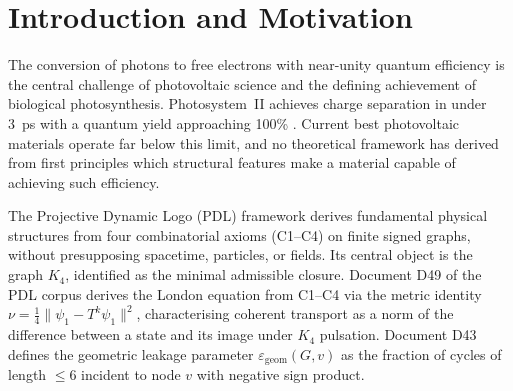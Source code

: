 \documentclass[12pt,a4paper]{article}
\newcommand{\epsgeom}{\varepsilon_{\mathrm{geom}}}
\begin{document}
\begin{abstract}
We derive a topological optimality criterion for coherent photon-to-electron
conversion from the axioms C1--C4 of the Projective Dynamic Logo (PDL)
framework. The central result (Theorem PDL-SP2) establishes that
the minimal geometric leakage $\epsgeom = 0$ is achievable on a bond
graph $G$ if and only if $G$ is bipartite — recovering the Harary
balance theorem (1953) as a corollary of C1--C4 without presupposition.
A four-criterion composite score derived from PDL selects six optimal
inorganic candidates from 21 families: BP, AlAs, GaP, AlP, GaN, and SiC.
GaN and BP are identified as priority candidates with direct gaps
of 1.73~eV and 1.24~eV respectively. An extension to hierarchical graphs
(Conjecture PDL-H) shows that global bipartition is the sole determining
condition — local graph structure is irrelevant for $\epsgeom(H)=0$.
This result is verified exhaustively on $2^{24} = 16\,777\,216$ sign
assignments for the case $H(C_5, C_4)$. Biological connection:
the Mg--Mg transfer network of Photosystem~II is bipartite, consistent
with PDL-H, while individual chlorophyll molecules are not — a two-scale
architecture that PDL explains naturally. Three falsifiable experimental
predictions are formulated, testable by femtosecond pump-probe spectroscopy
without free parameters.
\end{abstract}

\clearpage

\tableofcontents
\newpage

\section{Introduction and Motivation}
\label{sec:intro}

The conversion of photons to free electrons with near-unity quantum
efficiency is the central challenge of photovoltaic science and the
defining achievement of biological photosynthesis. Photosystem~II achieves
charge separation in under 3~ps with a quantum yield approaching 100\%
\cite{Fleming1988}. Current best photovoltaic materials operate far below
this limit, and no theoretical framework has derived from first principles
which structural features make a material capable of achieving such
efficiency.

The Projective Dynamic Logo (PDL) framework \cite{PDL_DM_v20} derives
fundamental physical structures from four combinatorial axioms (C1--C4)
on finite signed graphs, without presupposing spacetime, particles, or
fields. Its central object is the graph $K_4$, identified as the minimal
admissible closure. Document D49 of the PDL corpus derives the London
equation from C1--C4 via the metric identity
$\nu = \tfrac{1}{4}\|\psi_1 - T^k\psi_1\|^2$, characterising coherent
transport as a norm of the difference between a state and its image under
$K_4$ pulsation. Document D43 defines the geometric leakage parameter
$\epsgeom(G,v)$ as the fraction of cycles of length $\leq 6$ incident
to node $v$ with negative sign product.
\end{document}
